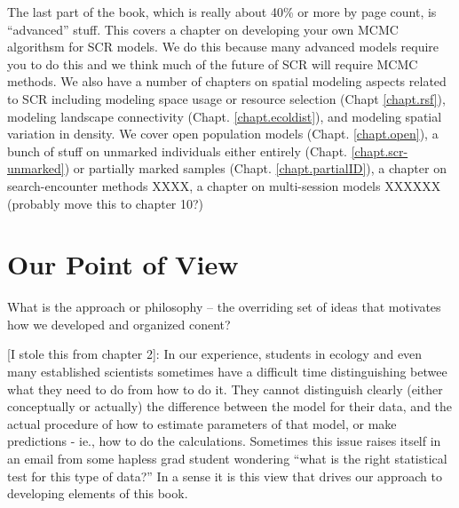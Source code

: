The last part of the book, which is really about 40\% or more by page
count, is ``advanced'' stuff. This covers a chapter on developing your
own MCMC algorithsm for SCR models. We do this because many advanced
models require you to do this and we think much of the future of SCR
will require MCMC methods. 
We also have a number of chapters on spatial modeling aspects related
to SCR including modeling 
space usage or resource selection (Chapt \ref{chapt.rsf}), modeling
landscape connectivity (Chapt. \ref{chapt.ecoldist}), and modeling
spatial variation in density. 
We cover open population models (Chapt. \ref{chapt.open}),
a bunch of stuff on unmarked individuals either entirely (Chapt. \ref{chapt.scr-unmarked})
or partially marked samples (Chapt. \ref{chapt.partialID}), 
a chapter on search-encounter methods XXXX, a chapter on multi-session
models XXXXXX (probably move this to chapter 10?)


\section*{Our Point of View}

What is the approach or philosophy -- the overriding set of ideas that
motivates how we developed and organized conent?

[I stole this from chapter 2]:
In our experience, students in ecology and even many established
scientists sometimes have a difficult time distinguishing
betwee what they need to do  from how to do
it.  They cannot distinguish clearly (either conceptually or actually)
the difference between the model for their data, and the actual
procedure of how to estimate parameters of that model, or make
predictions - ie., how to do the calculations. Sometimes this issue
raises itself in an email from some hapless grad student wondering
``what is the right statistical test for this type of data?''  In a
sense it is this view that drives our approach to developing elements
of this book.

